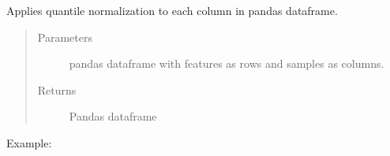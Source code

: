 \documentclass[letterpaper,10pt,english]{sphinxmanual}
\begin{document}
\begin{fulllineitems}
\label{\detokenize{_autosummary/analytics_core.analytics:analytics_core.analytics.analytics.quantile_normalization}}
Applies quantile normalization to each column in pandas dataframe.
\begin{quote}\begin{description}
\item[{Parameters}] \leavevmode
{} \textendash{} pandas dataframe with features as rows and samples as columns.

\item[{Returns}] \leavevmode
Pandas dataframe

\end{description}\end{quote}

Example:

\begin{sphinxVerbatim}[commandchars=\\\{\}]
  
\end{sphinxVerbatim}

\end{fulllineitems}

\end{document}

